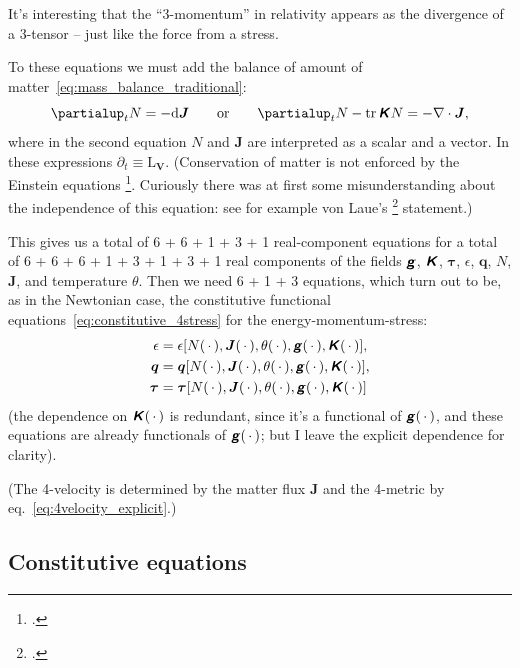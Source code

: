 \documentclass[\ifafour a4paper,12pt,\else a5paper,10pt,\fi%
onecolumn,oneside,article,%
british%
]{memoir}
\theoremstyle{remark}
\theoremstyle{innote}
\newcommand*{\mathte}[1]{\textbf{\textit{\textsf{#1}}}}
\newcommand*{\citep}{\footcites}
\newcommand*{\de}{\partialup}%
\newcommand*{\di}{\mathrm{d}}%
\DeclareMathOperator{\tr}{tr}%
\newcommand*{\dotv}{\mathord{\,\cdot\,}}%
\renewcommand*{\|}[1][]{\nonscript\,#1\vert\nonscript\;\mathopen{}}
\newcommand*{\sect}{\S}%
\newcommand*{\eqn}{eq.}%
\newcommand*{\eg}{{e.g.}}
\newcommand*{\Li}{\mathrm{L}}
\newcommand*{\yd}{N}
\newcommand*{\yjj}{J}
\newcommand*{\yj}{\bm{\yjj}}
\newcommand*{\yTT}{\tau}
\newcommand*{\yT}{\bm{\yTT}}
\newcommand*{\ynn}{V}
\newcommand*{\yn}{\bm{\ynn}}
\newcommand*{\ygg}{g}
\newcommand*{\yg}{\mathte{\ygg}}
\newcommand*{\yKK}{K}
\newcommand*{\yK}{\mathte{\yKK}}
\newcommand*{\ypp}{q}
\newcommand*{\yp}{\bm{\ypp}}
\newcommand*{\ye}{\epsilon}
\newcommand*{\yte}{\theta}
\newcommand*{\ynab}{\nabla}
\begin{document}
It's interesting that the \enquote{3-momentum} in relativity appears as the
divergence of a 3-tensor -- just like the force from a stress.

To these equations we must add the balance of amount of
matter~\eqref{eq:mass_balance_traditional}:
\begin{equation}
  \label{eq:mass_balance_gen-rel}
  \de_t\yd = - \di\yj
  \qquad\text{or}\qquad
  \de_t\yd -\tr\yK\yd = -\ynab\cdot\yj,
\end{equation}
where in the second equation $\yd$ and $\yj$ are interpreted as a scalar
and a vector. In these expressions $\de_t \equiv \Li_{\yn}$. (Conservation
of matter is not enforced by the Einstein equations
\citep[\eg][]{eckart1940c}[\sect~6.3.2]{gourgoulhon2007_r2012}[\sect~5.2]{baumgarteetal2010}[\sect~7.3]{rezzollaetal2013}[\sect~22.2]{misneretal1970_r1973}.
Curiously there was at first some misunderstanding about the independence
of this equation: see for example von Laue's \citep[p.~503]{vonlaue1949}
statement.)

This gives us a total of 6 + 6 + 1 + 3 + 1 real-component equations for a
total of 6 + 6 + 6 + 1 + 3 + 1 + 3 + 1 real components of the fields $\yg$,
$\yK$, $\yT$, $\ye$, $\yp$, $\yd$, $\yj$, and temperature $\yte$. Then we
need 6 + 1 + 3 equations, which turn out to be, as in the Newtonian case,
the constitutive functional equations~\eqref{eq:constitutive_4stress} for
the energy-momentum-stress:
\begin{subequations}\label{eq:constitutive_4stress_gen-rel}
  \begin{align}
    \label{eq:constit_energy_gen-rel}
    \ye &= \ye[\yd(\dotv),\yj(\dotv),\yte(\dotv),\yg(\dotv), \yK(\dotv)],
    \\
    \label{eq:constit_energy-flux_gen-rel}
    \yp &= \yp[\yd(\dotv),\yj(\dotv),\yte(\dotv),\yg(\dotv), \yK(\dotv)],
    \\
    \label{eq:constit_3stress_gen-rel}
    \yT &= \yT[\yd(\dotv),\yj(\dotv),\yte(\dotv),\yg(\dotv), \yK(\dotv)]
  \end{align}
\end{subequations}
(the dependence on $\yK(\dotv)$ is redundant, since it's a functional of
$\yg(\dotv)$, and these equations are already functionals of $\yg(\dotv)$;
but I leave the explicit dependence for clarity).

(The 4-velocity is determined by the matter flux $\yj$ and the 4-metric by
\eqn~\eqref{eq:4velocity_explicit}.)

\subsection{Constitutive equations}
\label{sec:constitutive equations}
\end{document}
